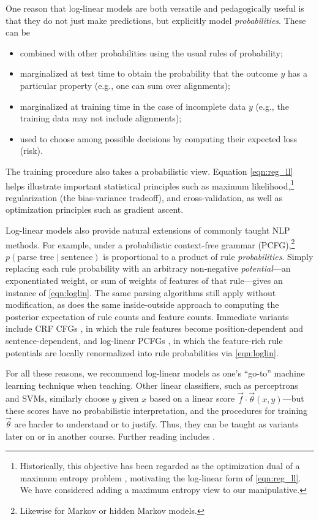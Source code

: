 \documentclass[11pt,letterpaper]{article}
\begin{document}
One reason that log-linear models are both versatile and pedagogically
useful is that they do not just make predictions, but explicitly 
model {\em probabilities}.  These can be 
\begin{itemize}
\item combined with other probabilities using the usual rules of probability;
\item marginalized at test time to obtain the probability that the outcome 
  $y$ has a particular property (e.g., one can sum over alignments);
\item marginalized at training time in the case of incomplete data $y$
  (e.g., the training data may not include alignments);
\item used to choose among possible decisions by computing their 
  expected loss (risk).
\end{itemize}
The training procedure also takes a probabilistic view.  Equation
\eqref{eqn:reg_ll} helps illustrate important statistical principles
such as maximum likelihood,\footnote{\label{fn:dual}Historically, this
  objective has been regarded as the optimization dual of a maximum
  entropy problem \cite{berger-dellapietra-dellapietra-1996},
  motivating the log-linear form of \eqref{eqn:reg_ll}.
  We have considered adding a maximum entropy view 
  to our manipulative.} regularization (the bias-variance
tradeoff), and cross-validation, as well as optimization principles
such as gradient ascent.

Log-linear models also provide natural extensions of commonly taught
NLP methods.  For example, under a probabilistic context-free
grammar (PCFG),\footnote{Likewise for Markov or hidden Markov models.}  $p(\text{parse tree}\mid\text{sentence})$ is proportional to
a product of rule {\em probabilities}.  Simply replacing each rule
probability with an arbitrary non-negative {\em potential}---an
exponentiated weight, or sum of weights of features of that
rule---gives an instance of \eqref{eqn:loglin}.  The same parsing
algorithms still apply without modification, as does the same
inside-outside approach to computing the posterior expectation of rule counts and 
feature counts.  Immediate variants include CRF CFGs
\cite{finkel2008efficient}, in which the rule features become
position-dependent and sentence-dependent, and log-linear PCFGs
\cite{bergkirkpatrick-et-al-2010}, in which the feature-rich rule
potentials are locally renormalized into rule probabilities via
\eqref{eqn:loglin}.

For all these reasons, we recommend log-linear models as one's
``go-to'' machine learning technique when teaching.  Other linear
classifiers, such as perceptrons and SVMs, similarly choose $y$ given
$x$ based on a linear score $\vec{f} \cdot \vec{\theta}(x,y)$---but
these scores have no probabilistic interpretation, and the procedures
for training $\vec{\theta}$ are harder to understand or to justify.
Thus, they can be taught as variants later on or in another course.
Further reading includes \cite{smith-2011}.
\end{document}
